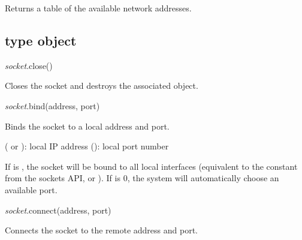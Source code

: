 \documentclass[a4paper,12pt,twoside,extrafontsizes]{memoir}
\begin{document}
\begin{funcret}
	Returns a table of the available network addresses.
\end{funcret}

\subsection{ type object}


\begin{luafuncprototype}
	\emph{socket}.close()
\end{luafuncprototype}

\begin{funcdescr}
	Closes the socket and destroys the associated object.
\end{funcdescr}


\begin{luafuncprototype}
	\emph{socket}.bind(address, port)
\end{luafuncprototype}

\begin{funcdescr}
	Binds the socket to a local address and port.
\end{funcdescr}

\begin{funcparams}
	 ( or ): local IP address
	 (): local port number
\end{funcparams}

\begin{funcremarks}
	If  is , the socket will be bound to all local interfaces (equivalent to the  constant from the sockets API, or ).
	If  is 0, the system will automatically choose an available port.
\end{funcremarks}


\begin{luafuncprototype}
	\emph{socket}.connect(address, port)
\end{luafuncprototype}

\begin{funcdescr}
	Connects the socket to the remote address and port.
\end{funcdescr}
\end{document}
